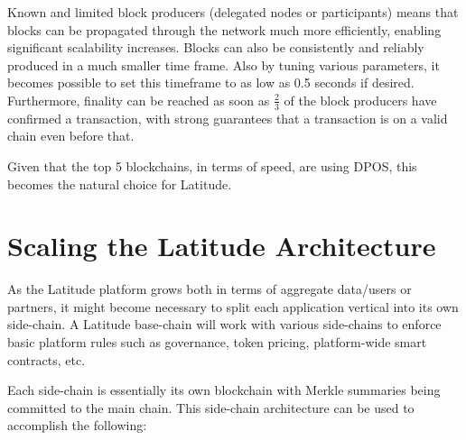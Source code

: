 Known and limited block producers (delegated nodes or participants) means that blocks can be propagated through the
network much more efficiently, enabling significant scalability increases. Blocks can also be consistently and reliably
produced in a much smaller time frame. Also by tuning various parameters, it becomes possible to set this timeframe to
as low as 0.5 seconds if desired.  Furthermore, finality can be reached as soon as $\frac{2}{3}$ of the block producers have
confirmed a transaction, with strong guarantees that a transaction is on a valid chain even before that. 

Given that the top 5 blockchains, in terms of speed, are using DPOS, this becomes the natural choice for Latitude.

\newpage
\section{Scaling the Latitude Architecture}
\label{app:latchain}

As the Latitude platform grows both in terms of aggregate data/users or partners, it might become necessary to split
each application vertical into its own side-chain. A Latitude base-chain will work with various side-chains to enforce
basic platform rules such as governance, token pricing, platform-wide smart contracts, etc.  

Each side-chain is essentially its own blockchain with Merkle summaries being committed to the main chain. This
side-chain architecture can be used to accomplish the following:

